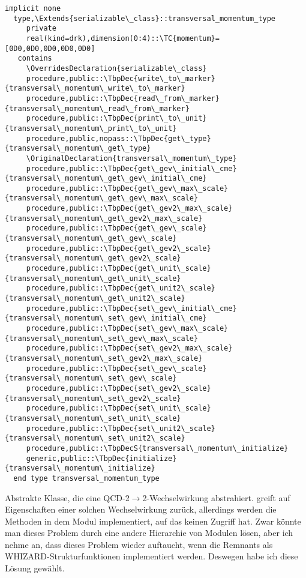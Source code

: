 \begin{Verbatim}
implicit none
  type,\Extends{serializable\_class}::transversal_momentum_type
     private
     real(kind=drk),dimension(0:4)::\TC{momentum}=[0D0,0D0,0D0,0D0,0D0]
   contains
     \OverridesDeclaration{serializable\_class}
     procedure,public::\TbpDec{write\_to\_marker}{transversal\_momentum\_write\_to\_marker}
     procedure,public::\TbpDec{read\_from\_marker}{transversal\_momentum\_read\_from\_marker}
     procedure,public::\TbpDec{print\_to\_unit}{transversal\_momentum\_print\_to\_unit}
     procedure,public,nopass::\TbpDec{get\_type}{transversal\_momentum\_get\_type}
     \OriginalDeclaration{transversal\_momentum\_type}
     procedure,public::\TbpDec{get\_gev\_initial\_cme}{transversal\_momentum\_get\_gev\_initial\_cme}
     procedure,public::\TbpDec{get\_gev\_max\_scale}{transversal\_momentum\_get\_gev\_max\_scale}
     procedure,public::\TbpDec{get\_gev2\_max\_scale}{transversal\_momentum\_get\_gev2\_max\_scale}
     procedure,public::\TbpDec{get\_gev\_scale}{transversal\_momentum\_get\_gev\_scale}
     procedure,public::\TbpDec{get\_gev2\_scale}{transversal\_momentum\_get\_gev2\_scale}
     procedure,public::\TbpDec{get\_unit\_scale}{transversal\_momentum\_get\_unit\_scale}
     procedure,public::\TbpDec{get\_unit2\_scale}{transversal\_momentum\_get\_unit2\_scale}
     procedure,public::\TbpDec{set\_gev\_initial\_cme}{transversal\_momentum\_set\_gev\_initial\_cme}
     procedure,public::\TbpDec{set\_gev\_max\_scale}{transversal\_momentum\_set\_gev\_max\_scale}
     procedure,public::\TbpDec{set\_gev2\_max\_scale}{transversal\_momentum\_set\_gev2\_max\_scale}
     procedure,public::\TbpDec{set\_gev\_scale}{transversal\_momentum\_set\_gev\_scale}
     procedure,public::\TbpDec{set\_gev2\_scale}{transversal\_momentum\_set\_gev2\_scale}
     procedure,public::\TbpDec{set\_unit\_scale}{transversal\_momentum\_set\_unit\_scale}
     procedure,public::\TbpDec{set\_unit2\_scale}{transversal\_momentum\_set\_unit2\_scale}
     procedure,public::\TbpDecS{transversal\_momentum\_initialize}
     generic,public::\TbpDec{initialize}{transversal\_momentum\_initialize}
  end type transversal_momentum_type
\end{Verbatim}
Abstrakte Klasse, die eine QCD-2$\rightarrow$2-Wechselwirkung abstrahiert.  greift auf Eigenschaften einer solchen Wechselwirkung zurück, allerdings werden die Methoden in dem Modul  implementiert, auf das  keinen Zugriff hat. Zwar könnte man dieses Problem durch eine andere Hierarchie von Modulen lösen, aber ich nehme an, dass dieses Problem wieder auftaucht, wenn die Remnants als WHIZARD-Strukturfunktionen implementiert werden. Deswegen habe ich diese Lösung gewählt.
